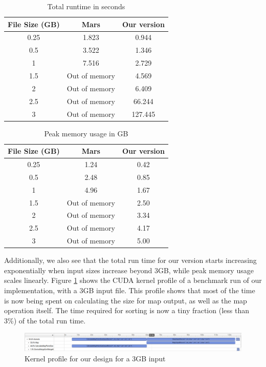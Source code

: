 \documentclass{article}
\begin{document}
\begin{table}[h!]
\centering
\begin{tabular}{|c|c|c|} 
 \hline
 File Size (GB) & Mars & Our version\\  
 \hline
 0.25 &  1.823 & 0.944  \\ 
 0.5 & 3.522 & 1.346  \\
 1 & 7.516 & 2.729  \\
 1.5 & Out of memory & 4.569 \\
 2 & Out of memory & 6.409 \\
 2.5 & Out of memory & 66.244 \\
 3 & Out of memory & 127.445 \\ 
\hline
\end{tabular}
\caption{Total runtime in seconds}
\label{table:total-runtime}
\end{table}

\begin{table}[h!]
\centering
\begin{tabular}{|c|c|c|} 
 \hline
 File Size (GB) & Mars & Our version\\  
 \hline
 0.25 &  1.24 & 0.42  \\ 
 0.5 & 2.48 & 0.85  \\
 1 & 4.96 & 1.67  \\
 1.5 & Out of memory & 2.50 \\
 2 & Out of memory & 3.34 \\
 2.5 & Out of memory & 4.17 \\
 3 & Out of memory & 5.00 \\ 
\hline
\end{tabular}
\caption{Peak memory usage in GB}
\label{table:peak-memory-use}
\end{table}

Additionally, we also see that the total run time for our version starts increasing exponentially when input sizes increase beyond 3GB, while peak memory usage scales linearly. Figure \ref{fig:mr-kernels-3gb} shows the CUDA kernel profile of a benchmark run of our implementation, with a 3GB input file. This profile shows that most of the time is now being spent on calculating the size for map output, as well as the map operation itself. The time required for sorting is now a tiny fraction (less than 3\%) of the total run time. 

\begin{figure}[h]
    \centering
    \includegraphics[width=1\linewidth]{images/mr-kernels-3gb.png}
    \caption{Kernel profile for our design for a 3GB input}
    \label{fig:mr-kernels-3gb}
\end{figure}
\end{document}
